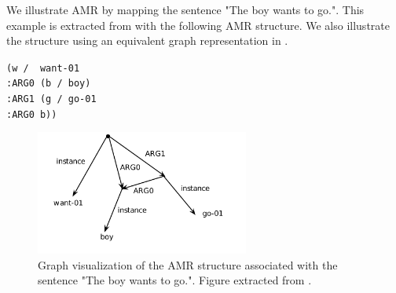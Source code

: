 We illustrate AMR by mapping the sentence "The boy wants to go.". This example is extracted from \textcite{banarescu2013abstract} with the following AMR structure. We also illustrate the structure using an equivalent graph representation in .

\begin{center}
\texttt{(w\,/\, want-01
    \\ :ARG0\,(b\,/\,boy)
    \\ :ARG1\,(g\,/\,go-01
    \\ :ARG0 b))}
\end{center}


\begin{figure}[!htb]
\begin{center}
\includegraphics[width=7cm]{images/amr-boy.png}
\end{center}
\caption{Graph visualization of the AMR structure associated with the sentence "The boy wants to go.". Figure extracted from \textcite{banarescu2013abstract}.}
\end{figure}



